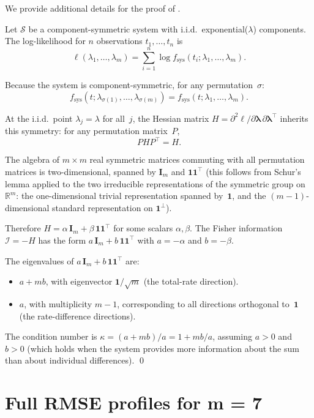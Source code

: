 \documentclass[12pt]{article}
\theoremstyle{definition}
\theoremstyle{remark}
\newcommand{\bone}{\mathbf{1}}
\newcommand{\blam}{\boldsymbol{\lambda}}
\begin{document}
We provide additional details for the proof of .

Let $\mathcal{S}$ be a component-symmetric system with i.i.d.\
exponential($\lambda$) components.  The log-likelihood for $n$
observations $t_1, \ldots, t_n$ is
\[
  \ell(\lambda_1, \ldots, \lambda_m)
  = \sum_{i=1}^{n} \log f_{\mathrm{sys}}(t_i; \lambda_1, \ldots, \lambda_m).
\]

Because the system is component-symmetric, for any permutation~$\sigma$:
\[
  f_{\mathrm{sys}}(t; \lambda_{\sigma(1)}, \ldots, \lambda_{\sigma(m)})
  = f_{\mathrm{sys}}(t; \lambda_1, \ldots, \lambda_m).
\]

At the i.i.d.\ point $\lambda_j = \lambda$ for all~$j$, the Hessian
matrix $H = \partial^2 \ell / \partial \blam \, \partial \blam^\top$
inherits this symmetry: for any permutation matrix~$P$,
\[
  P H P^\top = H.
\]

The algebra of $m \times m$ real symmetric matrices commuting with all
permutation matrices is two-dimensional, spanned by $\mathbf{I}_m$
and $\bone\bone^\top$ (this follows from Schur's lemma applied to the
two irreducible representations of the symmetric group on
$\mathbb{R}^m$: the one-dimensional trivial representation spanned
by~$\bone$, and the $(m-1)$-dimensional standard representation on
$\bone^\perp$).

Therefore $H = \alpha \, \mathbf{I}_m + \beta \, \bone\bone^\top$ for
some scalars $\alpha, \beta$.  The Fisher information
$\mathcal{I} = -H$ has the form $a \, \mathbf{I}_m + b \,
\bone\bone^\top$ with $a = -\alpha$ and $b = -\beta$.

The eigenvalues of
$a \, \mathbf{I}_m + b \, \bone\bone^\top$ are:
\begin{itemize}
  \item $a + mb$, with eigenvector $\bone / \sqrt{m}$ (the
    total-rate direction).
  \item $a$, with multiplicity $m - 1$, corresponding to all
    directions orthogonal to~$\bone$ (the rate-difference directions).
\end{itemize}

The condition number is
$\kappa = (a + mb) / a = 1 + mb/a$, assuming $a > 0$ and $b > 0$
(which holds when the system provides more information about the sum
than about individual differences).  \qed

\section{Full RMSE profiles for m = 7}
\label{app:m7profiles}
\end{document}
